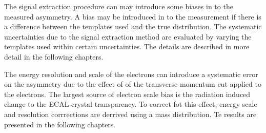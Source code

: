 The signal extraction procedure can may introduce some biases in to the measured
asymmetry. A bias may be introduced in to the measurement if there is a
difference between the \ETm templates used and the true \ETm distribution.  The
systematic uncertainties due to the signal extraction method are evaluated by
varying the templates used within certain uncertainties. The details are
described in more detail in the following chapters.

The energy resolution and scale of the electrons can introduce a systematic
error on the asymmetry due to the effect of of the transverse momentum cut
applied to the electrons. The largest source of electron scale bias is the
radiation induced change to the ECAL crystal transparency.
To correct fot this effect, energy scale and resolution corrrections are
derrived using a \Zee mass distribution. Te results are presented in the
following chapters.

